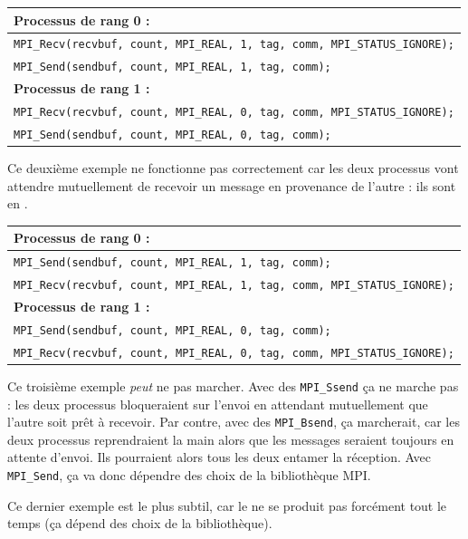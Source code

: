 \begin{tabular}{|l|}
  \hline
  \textbf{Processus de rang 0 :} \\
  \hline
  \texttt{MPI_Recv(recvbuf, count, MPI_REAL, 1, tag, comm, MPI_STATUS_IGNORE);} \\
  \texttt{MPI_Send(sendbuf, count, MPI_REAL, 1, tag, comm);} \\
\hline
\hline
\textbf{Processus de rang 1 :} \\
  \hline
  \texttt{MPI_Recv(recvbuf, count, MPI_REAL, 0, tag, comm, MPI_STATUS_IGNORE);} \\
  \texttt{MPI_Send(sendbuf, count, MPI_REAL, 0, tag, comm);} \\
\hline
\end{tabular}

Ce deuxième exemple ne fonctionne pas correctement car les deux processus vont
attendre mutuellement de recevoir un message en provenance de l'autre : ils sont
en .

\bigskip

\begin{tabular}{|l|}
  \hline
  \textbf{Processus de rang 0 :} \\
  \hline
  \texttt{MPI_Send(sendbuf, count, MPI_REAL, 1, tag, comm);} \\
  \texttt{MPI_Recv(recvbuf, count, MPI_REAL, 1, tag, comm, MPI_STATUS_IGNORE);} \\
\hline
\hline
\textbf{Processus de rang 1 :} \\
  \hline
  \texttt{MPI_Send(sendbuf, count, MPI_REAL, 0, tag, comm);} \\
  \texttt{MPI_Recv(recvbuf, count, MPI_REAL, 0, tag, comm, MPI_STATUS_IGNORE);} \\
\hline
\end{tabular}

Ce troisième exemple \emph{peut} ne pas marcher. Avec des \verb|MPI_Ssend| ça ne
marche pas : les deux processus bloqueraient sur l'envoi en attendant
mutuellement que l'autre soit prêt à recevoir. Par contre, avec des
\verb|MPI_Bsend|, ça marcherait, car les deux processus reprendraient la main
alors que les messages seraient toujours en attente d'envoi. Ils pourraient
alors tous les deux entamer la réception. Avec \verb|MPI_Send|, ça va donc
dépendre des choix de la bibliothèque MPI.

Ce dernier exemple est le plus subtil, car le  ne se
produit pas forcément tout le temps (ça dépend des choix de la
bibliothèque).

